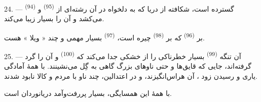 \VUsaut{3.0mm}
\VUsaut{3.0mm}

24. ---  \textsuperscript{(94)} گسترده است، شکافته
از دریا که به دلخواه در آن رشته‌ای از 
\textsuperscript{(95)} و  می‌کشد و آن را بسیار زیبا
می‌کند.

بر  \textsuperscript{(96)} که بر 
\textsuperscript{(98)} چیره است،  \textsuperscript{(97)}
بسیار مهمی و چند « ویلا » هست.

25. --- آن تنگه  \textsuperscript{(99)} بسیار خطرناکی را
از خشکی جدا می‌کند که  \textsuperscript{(100)}
و  آن را گرد گرفته‌اند، جایی که قایق‌ها و حتی ناوهای
بزرگ گاهی به گِل می‌نشینند. با همهٔ آمادگی یاری و رسیدن زود
، آن  هراس‌انگیزند، و در
 اعتدالین، چند ناو با مردم و کالا نابود شدند.

با همهٔ این همسایگی،  بسیار پررفت‌وآمد دریانوردان است.

\VUsaut{6.0mm}
\VUfilet{22mm}
